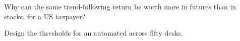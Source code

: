 \begin{interviewq}\label{iq:fm:finance-product-control-and-tax:5}
Why can the same trend-following return be worth more in futures than in stocks, for a US taxpayer?
\end{interviewq}

\begin{interviewq}\label{iq:fm:finance-product-control-and-tax:6}
Design the thresholds for an automated  across fifty desks.
\end{interviewq}

